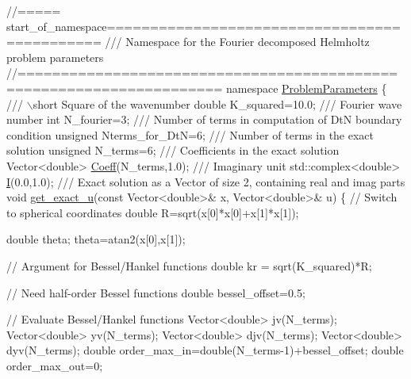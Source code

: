 \begin{DoxyCodeInclude}
\textcolor{comment}{//===== start\_of\_namespace=============================================}\textcolor{comment}{}
\textcolor{comment}{/// Namespace for the Fourier decomposed Helmholtz problem parameters}
\textcolor{comment}{}\textcolor{comment}{//=====================================================================}
\textcolor{keyword}{namespace }\hyperlink{namespaceProblemParameters}{ProblemParameters}
\{\textcolor{comment}{}
\textcolor{comment}{ /// \(\backslash\)short Square of the wavenumber}
\textcolor{comment}{} \textcolor{keywordtype}{double} K\_squared=10.0;
 \textcolor{comment}{}
\textcolor{comment}{ /// Fourier wave number}
\textcolor{comment}{} \textcolor{keywordtype}{int} N\_fourier=3;
 \textcolor{comment}{}
\textcolor{comment}{ /// Number of terms in computation of DtN boundary condition}
\textcolor{comment}{} \textcolor{keywordtype}{unsigned} Nterms\_for\_DtN=6;
\textcolor{comment}{}
\textcolor{comment}{ /// Number of terms in the exact solution}
\textcolor{comment}{} \textcolor{keywordtype}{unsigned} N\_terms=6; 
 \textcolor{comment}{}
\textcolor{comment}{ /// Coefficients in the exact solution}
\textcolor{comment}{} Vector<double> \hyperlink{namespaceProblemParameters_acb1788444ef78fe2adec824504f24246}{Coeff}(N\_terms,1.0);
\textcolor{comment}{}
\textcolor{comment}{ /// Imaginary unit }
\textcolor{comment}{} std::complex<double> \hyperlink{namespacePlanarWave_a541691caf71477c8c389062797c0fdab}{I}(0.0,1.0); 
\textcolor{comment}{}
\textcolor{comment}{ /// Exact solution as a Vector of size 2, containing real and imag parts}
\textcolor{comment}{} \textcolor{keywordtype}{void} \hyperlink{namespacePlanarWave_a00f252bcf0181187c656a58ce36b07b5}{get\_exact\_u}(\textcolor{keyword}{const} Vector<double>& x, Vector<double>& u)
 \{
  \textcolor{comment}{// Switch to spherical coordinates}
  \textcolor{keywordtype}{double} R=sqrt(x[0]*x[0]+x[1]*x[1]);
  
  \textcolor{keywordtype}{double} theta;
  theta=atan2(x[0],x[1]);
  
  \textcolor{comment}{// Argument for Bessel/Hankel functions}
  \textcolor{keywordtype}{double} kr = sqrt(K\_squared)*R;  
  
  \textcolor{comment}{// Need half-order Bessel functions}
  \textcolor{keywordtype}{double} bessel\_offset=0.5;

  \textcolor{comment}{// Evaluate Bessel/Hankel functions}
  Vector<double> jv(N\_terms);
  Vector<double> yv(N\_terms);
  Vector<double> djv(N\_terms);
  Vector<double> dyv(N\_terms);
  \textcolor{keywordtype}{double} order\_max\_in=double(N\_terms-1)+bessel\_offset;
  \textcolor{keywordtype}{double} order\_max\_out=0;
  

\end{DoxyCodeInclude}
